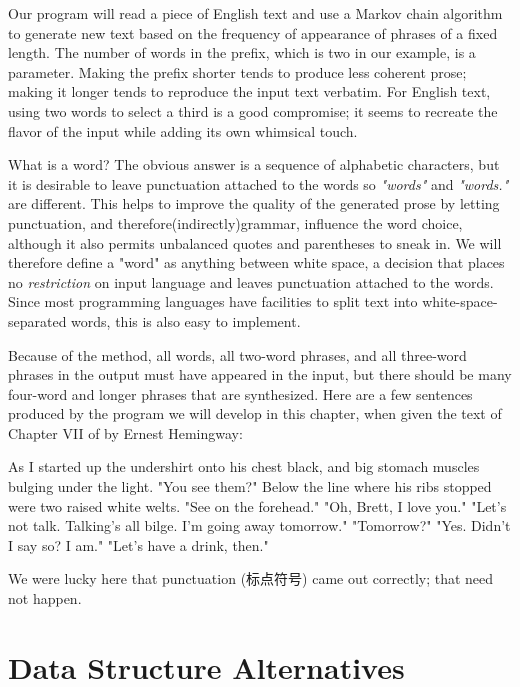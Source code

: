 Our program will read a piece of English text and use a Markov chain
algorithm to generate new text based on the frequency of appearance of
phrases of a fixed length. The number of words in the prefix, which is two
in our example, is a parameter. Making the prefix shorter tends to produce
less coherent prose; making it longer tends to reproduce the input text
verbatim. For English text, using two words to select a third is a good
compromise; it seems to recreate the flavor of the input while adding its
own whimsical touch.

What is a word? The obvious answer is a sequence of alphabetic characters,
but it is desirable to leave punctuation attached to the words so
\textit{"words"} and \textit{"words."} are different. This helps to improve
the quality of the generated prose by letting punctuation, and
therefore(indirectly)grammar, influence the word choice, although it also
permits unbalanced quotes and parentheses to sneak in. We will therefore
define a "word" as anything between white space, a decision that places no
\textit{restriction} on input language and leaves punctuation attached to
the words. Since most programming languages have facilities to split text
into white-space-separated words, this is also easy to implement.

Because of the method, all words, all two-word phrases, and all three-word
phrases in the output must have appeared in the input, but there should be
many four-word and longer phrases that are synthesized. Here are a few
sentences produced by the program we will develop in this chapter, when
given the text of Chapter VII of
 by Ernest Hemingway:
\begin{oldquote}
    As I started up the undershirt onto his chest black, and big stomach
    muscles bulging under the light. "You see them?" Below the line where
    his ribs stopped were two raised white welts. "See on the forehead."
    "Oh, Brett, I love you." "Let's not talk. Talking's all bilge. I'm
    going away tomorrow." "Tomorrow?" "Yes. Didn't I say so? I am." "Let's
    have a drink, then."
\end{oldquote}

We were lucky here that punctuation (标点符号) came out correctly; that
need not happen.

\section{Data Structure Alternatives}
\label{sec:data_structure_alternatives}

